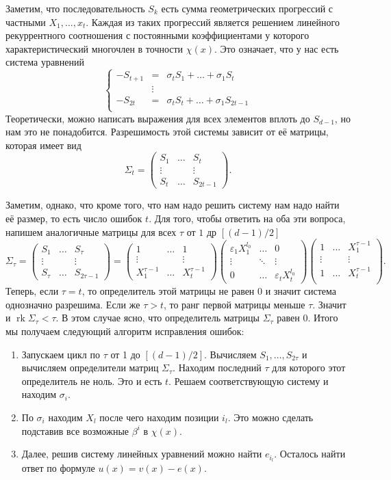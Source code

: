 \documentclass[12pt,a4paper,oneside]{book}
\theoremstyle{definition}
\newcommand{\rk}{\operatorname{rk}}
\def\eps{\varepsilon}
\def\enm{\begin{enumerate}}
\def\eenm{\end{enumerate}}
\def\pmat{\begin{pmatrix}}
\def\epmat{\end{pmatrix}}
\begin{document}
Заметим, что последовательность $S_k$ есть сумма геометрических прогрессий с частными $X_1,\dots,x_t$. Каждая из таких прогрессий является решением линейного рекуррентного соотношения с постоянными коэффициентами у которого характеристический многочлен в точности $\chi(x)$. Это означает, что у нас есть система уравнений 
$$\left\{ \begin{array}{rcl}
-S_{t+1}&=& \sigma_t S_1+\dots + \sigma_1 S_t\\
&\vdots&\\
-S_{2t}&=& \sigma_t S_t+\dots + \sigma_1 S_{2t-1}\\
\end{array} \right.$$
Теоретически, можно написать выражения для всех элементов вплоть до $S_{d-1}$, но нам это не понадобится. Разрешимость этой системы зависит от её матрицы, которая имеет вид 
$$ \Sigma_t =\pmat
S_1 & \dots & S_t\\
\vdots & & \vdots\\
S_t & \dots & S_{2t-1}
\epmat.
$$
 

Заметим, однако, что кроме того, что нам надо решить систему нам надо найти её размер, то есть число ошибок $t$. Для того, чтобы ответить на оба эти вопроса, напишем аналогичные матрицы для всех $\tau$  от $1$ др $[(d-1)/2]$ 
$$ \Sigma_\tau=\pmat
S_1 & \dots & S_\tau\\
\vdots & & \vdots\\
S_\tau & \dots & S_{2\tau-1}
\epmat =  \pmat
1 & \dots & 1\\
\vdots & & \vdots\\
X_1^{\tau-1} & \dots & X_t^{\tau-1}
\epmat
\pmat
\eps_1X_1^{l_0} & \dots & 0\\
\vdots & \ddots& \vdots\\
0 & \dots & \eps_t X_t^{l_0}
\epmat
\pmat
1& \dots & X_1^{\tau-1}\\
\vdots & & \vdots\\
1 & \dots & X_t^{\tau-1}\\
\epmat .
$$
Теперь, если $\tau=t$, то определитель этой матрицы не равен 0 и значит система однозначно разрешима. Если же $\tau>t$, то ранг первой матрицы меньше $\tau$. Значит и $\rk \Sigma_{\tau}<\tau$. В этом случае ясно, что определитель матрицы $\Sigma_{\tau}$ равен 0. Итого мы получаем следующий алгоритм исправления ошибок:
\enm 
\item Запускаем цикл по $\tau$ от 1 до $[(d-1)/2]$. Вычисляем $S_1,\dots,S_{2\tau}$ и вычисляем определители матриц $\Sigma_{\tau}$. Находим последний $\tau$ для которого этот определитель не ноль. Это и есть $t$. Решаем соответствующую систему и находим $\sigma_i$.
\item По $\sigma_i$ находим $X_l$ после чего находим позиции $i_l$. Это можно сделать подставив все возможные $\beta^i$ в $\chi(x)$.  
\item Далее, решив систему линейных уравнений можно найти $e_{i_l}$. Осталось  найти ответ по формуле $u(x)=v(x)-e(x)$.
\eenm
\end{document}
